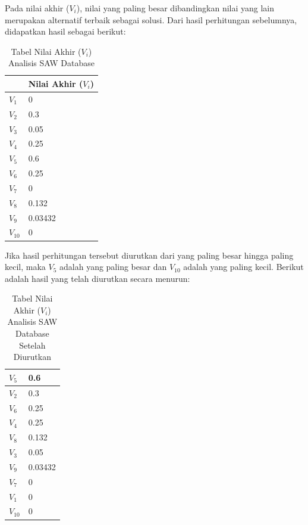 Pada nilai akhir ($V_{i}$), nilai yang paling besar dibandingkan nilai yang lain merupakan alternatif terbaik sebagai solusi. Dari hasil perhitungan sebelumnya, didapatkan hasil sebagai berikut:


\begin{table}[H]
	\centering
	\caption{Tabel Nilai Akhir ($V_{i}$) Analisis SAW Database}
		\begin{tabular}{| l | l |} \hline
    & Nilai Akhir ($V_{i}$)  \\ \hline
   $V_{1}$ & 0  \\ \hline
   $V_{2}$ & 0.3   \\ \hline
	 $V_{3}$ & 0.05  \\ \hline
   $V_{4}$ & 0.25   \\ \hline
	 $V_{5}$ & 0.6  \\ \hline
   $V_{6}$ & 0.25   \\ \hline
	 $V_{7}$ & 0  \\ \hline
   $V_{8}$ & 0.132   \\ \hline
	 $V_{9}$ & 0.03432  \\ \hline
   $V_{10}$ & 0   \\  \hline
    
				\end{tabular}
	\label{table:nilaiakhirrr}
\end{table}


Jika hasil perhitungan tersebut diurutkan dari yang paling besar hingga paling kecil, maka $V_{5}$ adalah yang paling besar dan $V_{10}$ adalah yang paling kecil. Berikut adalah hasil yang telah diurutkan secara menurun:

\begin{table}[H]
	\centering
	\caption{Tabel Nilai Akhir ($V_{i}$) Analisis SAW Database Setelah Diurutkan}
		\begin{tabular}{| l | l |} \hline
   $V_{5}$ &  0.6  \\ \hline 
	$V_{2}$ & 0.3  \\ \hline
	$V_{6}$ & 0.25   \\ \hline
	$V_{4}$ & 0.25  \\ \hline
	$V_{8}$ & 0.132  \\ \hline
	$V_{3}$ & 0.05   \\ \hline
	$V_{9}$ & 0.03432  \\ \hline
	$V_{7}$ & 0   \\ \hline
   $V_{1}$ & 0   \\ \hline	 
   $V_{10}$ & 0   \\ 
	     \hline
    
				\end{tabular}
	\label{table:nilaiakhirr}
\end{table}

